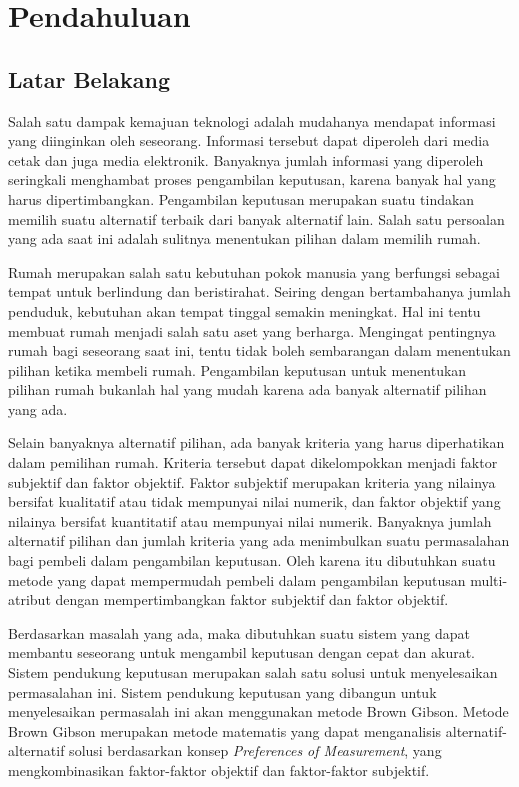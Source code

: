 \chapter{Pendahuluan}
\label{chap:intro}
   
\section{Latar Belakang}
\label{sec:label}

Salah satu dampak kemajuan teknologi adalah mudahanya mendapat informasi yang diinginkan oleh seseorang. Informasi tersebut dapat diperoleh dari media cetak dan juga media elektronik. Banyaknya jumlah informasi yang diperoleh seringkali menghambat proses pengambilan keputusan, karena banyak hal yang harus dipertimbangkan. Pengambilan keputusan merupakan suatu tindakan memilih suatu alternatif terbaik dari banyak alternatif lain. Salah satu persoalan yang ada saat ini adalah sulitnya menentukan pilihan dalam memilih rumah.

Rumah merupakan salah satu kebutuhan pokok manusia yang berfungsi sebagai tempat untuk berlindung dan beristirahat. Seiring dengan bertambahanya jumlah penduduk, kebutuhan akan tempat tinggal semakin meningkat. Hal ini tentu membuat rumah menjadi salah satu aset yang berharga. Mengingat pentingnya rumah bagi seseorang saat ini, tentu tidak boleh sembarangan dalam menentukan pilihan ketika membeli rumah. Pengambilan keputusan untuk menentukan pilihan rumah bukanlah hal yang mudah karena ada banyak alternatif pilihan yang ada.

Selain banyaknya alternatif pilihan, ada banyak kriteria yang harus diperhatikan dalam pemilihan rumah. Kriteria tersebut dapat dikelompokkan menjadi faktor subjektif dan faktor objektif.
Faktor subjektif merupakan kriteria yang nilainya bersifat kualitatif atau tidak mempunyai nilai numerik, dan faktor objektif yang nilainya bersifat kuantitatif atau mempunyai nilai numerik.
Banyaknya jumlah alternatif pilihan dan jumlah kriteria yang ada menimbulkan suatu permasalahan bagi pembeli dalam pengambilan keputusan. Oleh karena itu dibutuhkan suatu metode yang dapat mempermudah pembeli dalam pengambilan keputusan multi-atribut dengan mempertimbangkan faktor subjektif dan faktor objektif. 

Berdasarkan masalah yang ada, maka dibutuhkan suatu sistem yang dapat membantu seseorang untuk mengambil keputusan dengan cepat dan akurat. Sistem pendukung keputusan merupakan salah satu solusi untuk menyelesaikan permasalahan ini. Sistem pendukung keputusan yang dibangun untuk menyelesaikan permasalah ini akan menggunakan metode Brown Gibson. Metode Brown Gibson merupakan metode matematis yang dapat menganalisis alternatif-alternatif solusi berdasarkan konsep \textit{Preferences of Measurement}, yang mengkombinasikan faktor-faktor objektif dan faktor-faktor subjektif.



